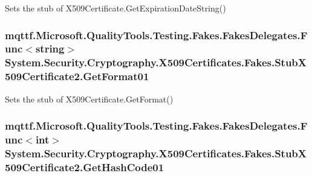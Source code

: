 Sets the stub of X509\-Certificate.\-Get\-Expiration\-Date\-String()

\hypertarget{class_system_1_1_security_1_1_cryptography_1_1_x509_certificates_1_1_fakes_1_1_stub_x509_certificate2_af0b7ae8b3206626de97ec8503c1d6557}{
\subsubsection[{Get\-Format01}]{\setlength{\rightskip}{0pt plus 5cm}mqttf.\-Microsoft.\-Quality\-Tools.\-Testing.\-Fakes.\-Fakes\-Delegates.\-Func$<$string$>$ System.\-Security.\-Cryptography.\-X509\-Certificates.\-Fakes.\-Stub\-X509\-Certificate2.\-Get\-Format01}}\label{class_system_1_1_security_1_1_cryptography_1_1_x509_certificates_1_1_fakes_1_1_stub_x509_certificate2_af0b7ae8b3206626de97ec8503c1d6557}


Sets the stub of X509\-Certificate.\-Get\-Format()

\hypertarget{class_system_1_1_security_1_1_cryptography_1_1_x509_certificates_1_1_fakes_1_1_stub_x509_certificate2_a5e3470ff2cb524f928b25aac3cecc2c2}{
\subsubsection[{Get\-Hash\-Code01}]{\setlength{\rightskip}{0pt plus 5cm}mqttf.\-Microsoft.\-Quality\-Tools.\-Testing.\-Fakes.\-Fakes\-Delegates.\-Func$<$int$>$ System.\-Security.\-Cryptography.\-X509\-Certificates.\-Fakes.\-Stub\-X509\-Certificate2.\-Get\-Hash\-Code01}}\label{class_system_1_1_security_1_1_cryptography_1_1_x509_certificates_1_1_fakes_1_1_stub_x509_certificate2_a5e3470ff2cb524f928b25aac3cecc2c2}


